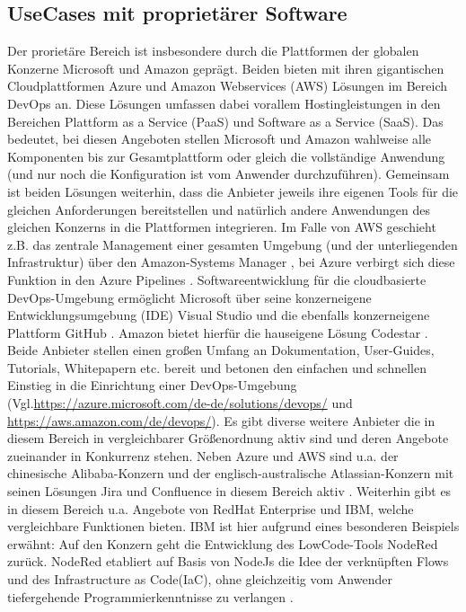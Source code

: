 \subsection{UseCases mit proprietärer Software}
\label{UseCases mit proprietärer Software}
Der prorietäre Bereich ist insbesondere durch die Plattformen der globalen Konzerne Microsoft und Amazon geprägt. Beiden bieten mit ihren gigantischen Cloudplattformen Azure und Amazon Webservices (\acrshort{AWS}) Lösungen im Bereich \gls{DevOps} an. Diese Lösungen umfassen dabei vorallem Hostingleistungen in den Bereichen Plattform as a Service (\acrshort{PaaS}) und Software as a Service (\acrshort{SaaS}). Das bedeutet, bei diesen Angeboten stellen Microsoft und Amazon wahlweise alle Komponenten bis zur Gesamtplattform oder gleich die vollständige Anwendung (und nur noch die Konfiguration ist vom Anwender durchzuführen).
Gemeinsam ist beiden Lösungen weiterhin, dass die Anbieter jeweils ihre eigenen Tools für die gleichen Anforderungen bereitstellen und natürlich andere Anwendungen des gleichen Konzerns in die Plattformen integrieren.
Im Falle von \acrshort{AWS} geschieht z.B. das zentrale Management einer gesamten Umgebung (und der unterliegenden Infrastruktur) über den Amazon-Systems Manager \cite{aws_systems_manager}, bei Azure verbirgt sich diese Funktion in den Azure Pipelines \cite{azure_devops_lösungen}.
Softwareentwicklung für die cloudbasierte \gls{DevOps}-Umgebung ermöglicht Microsoft über seine konzerneigene Entwicklungsumgebung (\acrshort{IDE}) Visual Studio und die ebenfalls konzerneigene Plattform  GitHub \cite{azure_devops_lösungen}. Amazon bietet hierfür die hauseigene Lösung Codestar \cite{aws_codestar}.
Beide Anbieter stellen einen großen Umfang an Dokumentation, User-Guides, Tutorials, Whitepapern etc. bereit und betonen den einfachen und schnellen Einstieg in die Einrichtung einer \gls{DevOps}-Umgebung (Vgl.\url{https://azure.microsoft.com/de-de/solutions/devops/} und \url{https://aws.amazon.com/de/devops/}).\newline
Es gibt diverse weitere Anbieter die in diesem Bereich in vergleichbarer Größenordnung aktiv sind und deren Angebote zueinander in Konkurrenz stehen. Neben Azure und \acrshort{AWS} sind u.a. der chinesische Alibaba-Konzern \cite{alibaba_devops} und der englisch-australische Atlassian-Konzern mit seinen Lösungen Jira und Confluence in diesem Bereich aktiv \cite{atlassian_jira_nodate}. 
Weiterhin gibt es in diesem Bereich u.a. Angebote von RedHat Enterprise \cite{redhat_openshift_2017} und IBM, welche vergleichbare Funktionen bieten. IBM ist hier aufgrund eines besonderen Beispiels erwähnt: Auf den Konzern geht die Entwicklung des \gls{LowCode}-Tools NodeRed zurück. NodeRed etabliert auf Basis von NodeJs die Idee der verknüpften Flows und des \glqq{}Infrastructure as Code\grqq (\acrshort{IaC}), ohne gleichzeitig vom Anwender tiefergehende Programmierkenntnisse zu verlangen \cite{nodered_about}.
